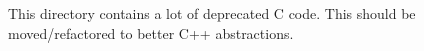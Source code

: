 This directory contains a lot of deprecated C code. This should be moved/refactored to better C++ abstractions. 